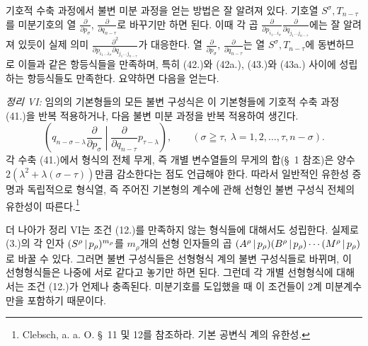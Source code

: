 기호적 수축 과정에서 불변 미분 과정을 얻는 방법은 잘 알려져 있다. 기호열 $S^\sigma,T_{n-\tau}$를 미분기호의 열 $\frac{\partial}{\partial p_\sigma}$, $\frac{\partial}{\partial q_{n-\tau}}$로 바꾸기만 하면 된다. 이때 각 곱 $\frac{\partial}{\partial p_{i_1\ldots i_\sigma}}\frac{\partial}{\partial q_{j_1\ldots j_{n-\tau}}}$에는 잘 알려져 있듯이 실제 의미 $\frac{\partial^2}{\partial p_{i_1\ldots i_\sigma}\partial q_{j_1\ldots j_{n-\tau}}}$가 대응한다. 열 $\frac{\partial}{\partial p_\sigma}$, $\frac{\partial}{\partial q_{n-\tau}}$는 열 $S^\sigma,T_{n-\tau}$에 동변하므로 이들과 같은 항등식들을 만족하며, 특히 (42.)와 (42a.), (43.)와 (43a.) 사이에 성립하는 항등식들도 만족한다. 요약하면 다음을 얻는다.

\emph{정리 VI:} 임의의 기본형들의 모든 불변 구성식은 이 기본형들에 기호적 수축 과정 (41.)을 반복 적용하거나, 다음 불변 미분 과정을 반복 적용하여 생긴다.
\begin{equation}
 \left(q_{n-\sigma-\lambda}\frac{\partial}{\partial p_\sigma}\middle|\frac{\partial}{\partial q_{n-\tau}}p_{\tau-\lambda}\right),
 \qquad(\sigma\geqq\tau,\ \lambda=1,2,\ldots,\tau,n-\sigma).
\tag{45}
\end{equation}
각 수축 (41.)에서 형식의 전체 무게, 즉 개별 변수열들의 무게의 합(\S\ 1 참조)은 양수 $2(\lambda^2+\lambda(\sigma-\tau))$만큼 감소한다는 점도 언급해야 한다. 따라서 일반적인 유한성 증명과 독립적으로 형식열, 즉 주어진 기본형의 계수에 관해 선형인 불변 구성식 전체의 유한성이 따른다.\footnote{Clebsch, a. a. O. \S\ 11 및 12를 참조하라. 기본 공변식 계의 유한성.}

더 나아가 정리 VI는 조건 (12.)를 만족하지 않는 형식들에 대해서도 성립한다. 실제로 (3.)의 각 인자 $(S^\rho\,|\,p_\rho)^{m_\rho}$를 $m_\rho$개의 선형 인자들의 곱 $(A^\rho\,|\,p_\rho)(B^\rho\,|\,p_\rho)\cdots(M^\rho\,|\,p_\rho)$로 바꿀 수 있다. 그러면 불변 구성식들은 선형형식 계의 불변 구성식들로 바뀌며, 이 선형형식들은 나중에 서로 같다고 놓기만 하면 된다. 그런데 각 개별 선형형식에 대해서는 조건 (12.)가 언제나 충족된다. 미분기호를 도입했을 때 이 조건들이 2계 미분계수만을 포함하기 때문이다.

